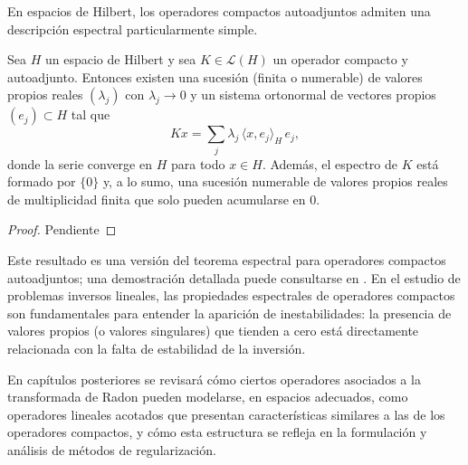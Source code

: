 En espacios de Hilbert, los operadores compactos autoadjuntos admiten una descripción espectral particularmente simple.

\begin{theorem}
Sea $H$ un espacio de Hilbert y sea $K \in \mathcal{L}(H)$ un operador compacto y autoadjunto. Entonces existen una sucesión (finita o numerable) de valores propios reales $(\lambda_{j})$ con $\lambda_{j} \to 0$ y un sistema ortonormal de vectores propios $(e_{j}) \subset H$ tal que
\[
K x = \sum_{j} \lambda_{j} \,\langle x,e_{j} \rangle_{H}\, e_{j},
\]
donde la serie converge en $H$ para todo $x \in H$. Además, el espectro de $K$ está formado por $\{0\}$ y, a lo sumo, una sucesión numerable de valores propios reales de multiplicidad finita que solo pueden acumularse en $0$.
\end{theorem}

\begin{proof}
    Pendiente
\end{proof}

Este resultado es una versión del teorema espectral para operadores compactos autoadjuntos; una demostración detallada puede consultarse en \cite{kirsch2011}. En el estudio de problemas inversos lineales, las propiedades espectrales de operadores compactos son fundamentales para entender la aparición de inestabilidades: la presencia de valores propios (o valores singulares) que tienden a cero está directamente relacionada con la falta de estabilidad de la inversión.

En capítulos posteriores se revisará cómo ciertos operadores asociados a la transformada de Radon pueden modelarse, en espacios adecuados, como operadores lineales acotados que presentan características similares a las de los operadores compactos, y cómo esta estructura se refleja en la formulación y análisis de métodos de regularización.
